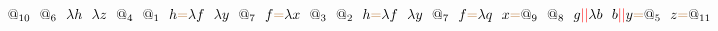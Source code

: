 \documentclass[a4paper, 10pt]{article}
\newcommand{\tikzmark}[3][]{\tikz[remember picture,baseline] \node [inner xsep=0pt,anchor=base,#1](#2) {#3};}
\begin{document}
\[\tikzmark{1}{$@_{10}$}\ \ \tikzmark{2}{$@_6$}\ \ \tikzmark{3}{$\lambda h$}\ \ \tikzmark{4}{$\lambda z$}\ \ \tikzmark{5}{$@_4$}\ \ \tikzmark{6}{$@_1$}\ \ \tikzmark{7}{$h$}\tikzmark{}{\color{brown}{=}}\tikzmark{8}{$\lambda f$}\ \ \tikzmark{9}{$\lambda y$}\ \ \tikzmark{10}{$@_7$}\ \ \tikzmark{11}{$f$}\tikzmark{}{\color{brown}{=}}\tikzmark{12}{$\lambda x$}\ \ \tikzmark{13}{$@_3$}\ \ \tikzmark{14}{$@_2$}\ \ \tikzmark{15}{$h$}\tikzmark{}{\color{brown}{=}}\tikzmark{16}{$\lambda f$}\ \ \tikzmark{17}{$\lambda y$}\ \ \tikzmark{18}{$@_7$}\ \ \tikzmark{19}{$f$}\tikzmark{}{\color{brown}{=}}\tikzmark{20}{$\lambda q$}\ \ \tikzmark{21}{$x$}\tikzmark{}{\color{brown}{=}}\tikzmark{22}{$@_9$}\ \ \tikzmark{23}{$@_8$}\ \ \tikzmark{24}{$g$}\tikzmark{}{\color{red}{||}}\tikzmark{25}{$\lambda b$}\ \ \tikzmark{26}{$b$}\tikzmark{}{\color{red}{||}}\tikzmark{27}{$y$}\tikzmark{}{\color{brown}{=}}\tikzmark{29}{$@_5$}\ \ \tikzmark{30}{$z$}\tikzmark{}{\color{brown}{=}}\tikzmark{31}{$@_{11}$}\]
\end{document}
